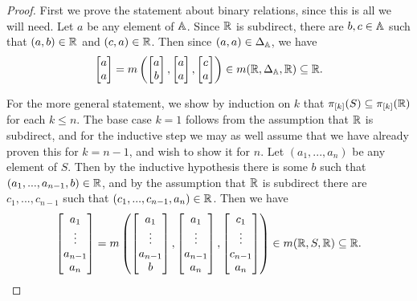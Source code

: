 \documentclass[letterpaper,11pt]{article}
\begin{document}
\begin{proof} First we prove the statement about binary relations, since this is all we will need. Let $a$ be any element of $\mathbb{A}$. Since $\mathbb{R}$ is subdirect, there are $b, c \in \mathbb{A}$ such that $(a,b) \in \mathbb{R}$ and $(c,a) \in \mathbb{R}$. Then since $(a,a) \in \Delta_{\mathbb{A}}$, we have
\[
\begin{bmatrix} a\\ a \end{bmatrix} = m\left(\begin{bmatrix} a\\ b \end{bmatrix}, \begin{bmatrix} a\\ a \end{bmatrix}, \begin{bmatrix} c\\ a \end{bmatrix}\right) \in m(\mathbb{R},\Delta_{\mathbb{A}},\mathbb{R}) \subseteq \mathbb{R}.
\]

For the more general statement, we show by induction on $k$ that $\pi_{[k]}(S) \subseteq \pi_{[k]}(\mathbb{R})$ for each $k \le n$. The base case $k = 1$ follows from the assumption that $\mathbb{R}$ is subdirect, and for the inductive step we may as well assume that we have already proven this for $k = n-1$, and wish to show it for $n$. Let $(a_1, ..., a_n)$ be any element of $S$. Then by the inductive hypothesis there is some $b$ such that $(a_1,...,a_{n-1},b) \in \mathbb{R}$, and by the assumption that $\mathbb{R}$ is subdirect there are $c_1, ..., c_{n-1}$ such that $(c_1, ..., c_{n-1},a_n) \in \mathbb{R}$. Then we have
\[
\begin{bmatrix} a_1\\ \vdots \\ a_{n-1} \\ a_n \end{bmatrix} = m\left(\begin{bmatrix} a_1 \\ \vdots \\ a_{n-1} \\ b \end{bmatrix}, \begin{bmatrix} a_1\\ \vdots \\ a_{n-1} \\ a_n \end{bmatrix}, \begin{bmatrix} c_1\\ \vdots \\ c_{n-1} \\ a_n \end{bmatrix}\right) \in m(\mathbb{R},S,\mathbb{R}) \subseteq \mathbb{R}.\qedhere
\]
\end{proof}
\end{document}

